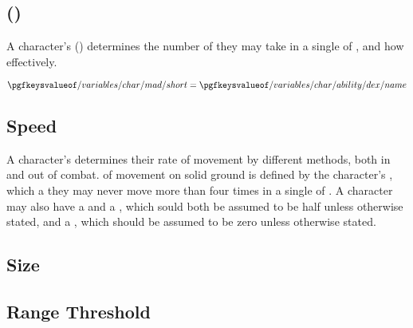 \subsection{ ()}
A character's  () determines the number of  they may take in a single  of , and how effectively.

\begin{equation}
	\getvalue{char/mad/short} = \getvalue{char/ability/dex/name}
\end{equation}

\subsection{Speed}
A character's  determines their rate of movement by different methods, both in and out of combat.  of movement on solid ground is defined by the character's , which a they may never move more than four times in a single  of . A character may also have a  and a , which sould both be assumed to be half  unless otherwise stated, and a , which should be assumed to be zero unless otherwise stated.

\subsection{Size}
\lipsum[1-1]

\subsection{Range Threshold}
\lipsum[1-1]
